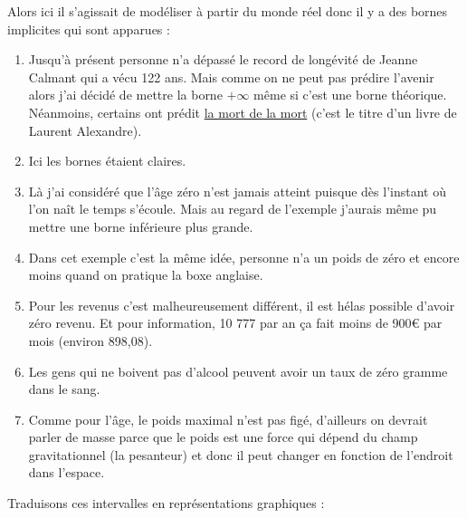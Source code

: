\documentclass[a4paper, 11pt, twoside]{article}
\begin{document}
Alors ici il s'agissait de modéliser à partir du monde réel donc il
y a des bornes implicites qui sont apparues :
\begin{enumerate}
\item Jusqu'à présent personne n'a dépassé le record de longévité de
Jeanne Calmant qui a vécu 122 ans. Mais comme on ne peut pas
prédire l'avenir alors j'ai décidé de mettre la borne \(+\infty\)
même si c'est une borne théorique. Néanmoins, certains ont
prédit \href{https://amzn.to/3OKi2os}{la mort de la mort} (c'est le titre d'un livre de Laurent
Alexandre).
\item Ici les bornes étaient claires.
\item Là j'ai considéré que l'âge zéro n'est jamais atteint puisque
dès l'instant où l'on naît le temps s'écoule. Mais au regard de
l'exemple j'aurais même pu mettre une borne inférieure plus
grande.
\item Dans cet exemple c'est la même idée, personne n'a un poids de
zéro et encore moins quand on pratique la boxe anglaise.
\item Pour les revenus c'est malheureusement différent, il est hélas
possible d'avoir zéro revenu. Et pour information, 10 777 par an
ça fait moins de 900€ par mois (environ 898,08).
\item Les gens qui ne boivent pas d'alcool peuvent avoir un taux de
zéro gramme dans le sang.
\item Comme pour l'âge, le poids maximal n'est pas figé, d'ailleurs on
devrait parler de masse parce que le poids est une force qui
dépend du champ gravitationnel (la pesanteur) et donc il peut
changer en fonction de l'endroit dans l'espace.
\end{enumerate}

Traduisons ces intervalles en représentations graphiques :
\end{document}
